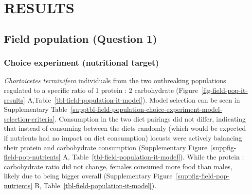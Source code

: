 \documentclass[
]{article}
\begin{document}
\section{RESULTS}\label{results}

\subsection{Field population (Question
1)}\label{field-population-question-1-1}

\subsubsection{Choice experiment (nutritional
target)}\label{choice-experiment-nutritional-target}

\emph{Chortoicetes terminifera} individuals from the two outbreaking
populations regulated to a specific ratio of 1 protein : 2 carbohydrate
(Figure~\ref{fig-field-pop-it-results}
A,Table~\ref{tbl-field-population-it-model}). Model selection can be
seen in
Supplementary Table~\ref{supptbl-field-population-choice-experiment-model-selection-criteria}.
Consumption in the two diet pairings did not differ, indicating that
instead of consuming between the diets randomly (which would be expected
if nutrients had no impact on diet consumption) locusts were actively
balancing their protein and carbohydrate consumption
(Supplementary Figure~\ref{suppfig-field-pop-nutrients} A,
Table~\ref{tbl-field-population-it-model}). While the protein :
carbohydrate ratio did not change, females consumed more food than
males, likely due to being bigger overall
(Supplementary Figure~\ref{suppfig-field-pop-nutrients} B,
Table~\ref{tbl-field-population-it-model}).

\begingroup
\fontsize{12.0pt}{14.4pt}\selectfont
\end{document}
